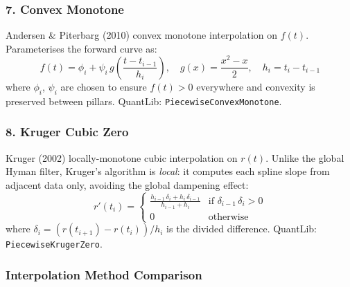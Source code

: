 \documentclass[11pt, a4paper]{article}
\begin{document}
\subsubsection{7. Convex Monotone}

Andersen \& Piterbarg (2010) convex monotone interpolation on $f(t)$.
Parameterises the forward curve as:
\begin{equation}
  f(t) = \phi_i + \psi_i\,g\!\left(\frac{t-t_{i-1}}{h_i}\right),
  \quad g(x) = \frac{x^2 - x}{2},
  \quad h_i = t_i - t_{i-1}
\end{equation}
where $\phi_i$, $\psi_i$ are chosen to ensure $f(t) > 0$ everywhere and
convexity is preserved between pillars. QuantLib: \texttt{PiecewiseConvexMonotone}.

\subsubsection{8. Kruger Cubic Zero}

Kruger (2002) locally-monotone cubic interpolation on $r(t)$. Unlike the global
Hyman filter, Kruger's algorithm is \emph{local}: it computes each spline slope
from adjacent data only, avoiding the global dampening effect:
\begin{equation}
  r'(t_i) = \begin{cases}
    \frac{h_{i-1}\,\delta_i + h_i\,\delta_{i-1}}{h_{i-1}+h_i}
    & \text{if } \delta_{i-1}\,\delta_i > 0 \\
    0 & \text{otherwise}
  \end{cases}
\end{equation}
where $\delta_i = (r(t_{i+1})-r(t_i))/h_i$ is the divided difference.
QuantLib: \texttt{PiecewiseKrugerZero}.

\subsubsection{Interpolation Method Comparison}
\end{document}
